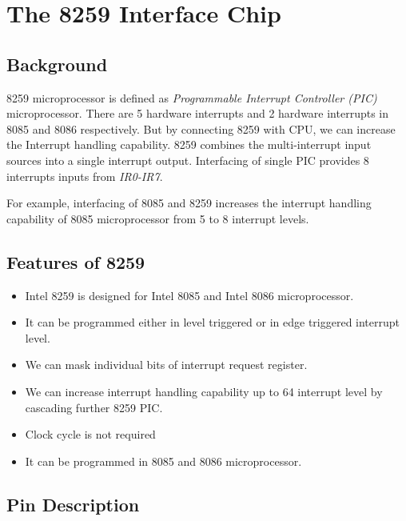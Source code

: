 \section{The 8259 Interface Chip}

\subsection{Background}

8259 microprocessor is defined as \textit{Programmable Interrupt Controller (PIC)}  microprocessor.
There are 5 hardware interrupts and 2 hardware interrupts in 8085 and 8086 respectively. But by
connecting 8259 with CPU, we can increase the Interrupt handling capability. 8259 combines the
multi-interrupt input sources into a single interrupt output. Interfacing of single PIC provides 8
interrupts inputs from \textit{IR0-IR7}.

For example, interfacing of 8085 and 8259 increases the interrupt handling capability of 8085
microprocessor from 5 to 8 interrupt levels.

\subsection{Features of 8259}

\begin{itemize}
    \item Intel 8259 is designed for Intel 8085 and Intel 8086 microprocessor.
    \item It can be programmed either in level triggered or in edge triggered interrupt level.
    \item We can mask individual bits of interrupt request register.
    \item We can increase interrupt handling capability up to 64 interrupt level by cascading
          further 8259 PIC.
    \item Clock cycle is not required
    \item It can be programmed in 8085 and 8086 microprocessor.
\end{itemize}

\subsection{Pin Description}
